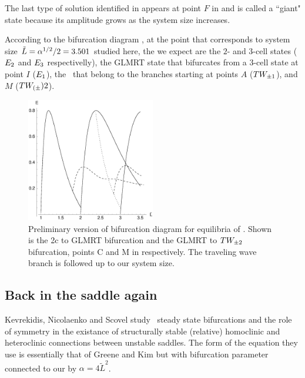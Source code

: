 The last type of solution identified in  appears at point $F$ 
in  and is called a
``giant" state because its amplitude grows as the system size increases.

According to the bifurcation diagram , 
at the point that corresponds to system size $\tilde{L}=\alpha^{1/2}/2=3.501$
studied here,
the {\eqva} we expect are the $2$- and $3$-cell states ($E_{2}$ and $E_{3}$ respectivelly), the GLMRT state that bifurcates from a $3$-cell state at point $I$ ($E_{1}$),
the \reqva\ that belong to the branches starting at points $A$ ($TW_{\pm1}$),
and $M$ ($TW_{(\pm}){2}$).

\begin{figure}[t]
\centering
\includegraphics[width=0.5\textwidth]{figs/ksBifDiag.eps}
\caption{
	{\small
	Preliminary version of bifurcation diagram for equilibria of \KSe.  Shown is the 2c to GLMRT bifurcation and the GLMRT to $TW_{\pm2}$ bifurcation, points C and M in  respectively. The traveling wave branch is followed up to our system size.} %
        }
\label{fig:ksBifDiag}
\end{figure}

\subsection{Back in the saddle again}

Kevrekidis, Nicolaenko and Scovel  study \KSe\ steady state bifurcations and the role of symmetry in the existance of structurally stable (relative) homoclinic and heteroclinic connections between unstable saddles. The form  of the equation they use is
essentially that of Greene and Kim but with bifurcation parameter connected to our by $\alpha=4\tilde{L}^2$.



